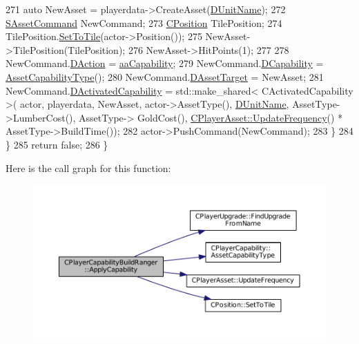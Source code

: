 \begin{DoxyCode}
271             \textcolor{keyword}{auto} NewAsset = playerdata->CreateAsset(\hyperlink{classCPlayerCapabilityBuildRanger_a4e85674699365fe1e77bcb2a1996d7ba}{DUnitName});
272             \hyperlink{structSAssetCommand}{SAssetCommand} NewCommand;
273             \hyperlink{classCPosition}{CPosition} TilePosition;
274             TilePosition.\hyperlink{classCPosition_ae302aa21792de64c97de29e2cbbfeb94}{SetToTile}(actor->Position());
275             NewAsset->TilePosition(TilePosition);
276             NewAsset->HitPoints(1);
277             
278             NewCommand.\hyperlink{structSAssetCommand_a8edd3b3d59a76d5514ba403bc8076a75}{DAction} = \hyperlink{GameDataTypes_8h_ab47668e651a3032cfb9c40ea2d60d670acf9fb164e8abd71c71f4a8c7fda360d4}{aaCapability};
279             NewCommand.\hyperlink{structSAssetCommand_a734ea7c6847457b437360f333f570ff9}{DCapability} = \hyperlink{classCPlayerCapability_a433bb196cd6ab6a932f1cac102b3aa98}{AssetCapabilityType}();
280             NewCommand.\hyperlink{structSAssetCommand_a3d9b43f6e59c386c48c41a65448a0c39}{DAssetTarget} = NewAsset;
281             NewCommand.\hyperlink{structSAssetCommand_ad8beda19520811cc70fe1eab16c774dd}{DActivatedCapability} = std::make\_shared< CActivatedCapability >(
      actor, playerdata, NewAsset, actor->AssetType(), \hyperlink{classCPlayerCapabilityBuildRanger_a4e85674699365fe1e77bcb2a1996d7ba}{DUnitName}, AssetType->LumberCost(), AssetType->
      GoldCost(), \hyperlink{classCPlayerAsset_a0aff85b9552967a42f4f3f42cb59c19f}{CPlayerAsset::UpdateFrequency}() * AssetType->BuildTime());
282             actor->PushCommand(NewCommand);
283         \}
284     \}
285     \textcolor{keywordflow}{return} \textcolor{keyword}{false};
286 \}
\end{DoxyCode}
Here is the call graph for this function\+:
\nopagebreak
\begin{figure}[H]
\begin{center}
\leavevmode
\includegraphics[width=350pt]{classCPlayerCapabilityBuildRanger_a113a97c3d833f206d333cb0e2e37aa31_cgraph}
\end{center}
\end{figure}
\hypertarget{classCPlayerCapabilityBuildRanger_a2e688d8f68ab53402afe9303dd28754a}{}\label{classCPlayerCapabilityBuildRanger_a2e688d8f68ab53402afe9303dd28754a} 

